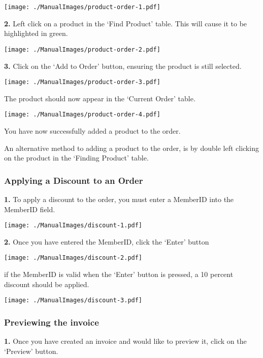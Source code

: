 \texttt{[image: ./ManualImages/product-order-1.pdf]}

\textbf{2.} Left click on a product in the `Find Product' table. This will cause it to be highlighted in green.

\texttt{[image: ./ManualImages/product-order-2.pdf]}

\textbf{3.} Click on the `Add to Order' button, ensuring the product is still selected.

\texttt{[image: ./ManualImages/product-order-3.pdf]}

The product should now appear in the `Current Order' table.

\texttt{[image: ./ManualImages/product-order-4.pdf]}

You have now successfully added a product to the order.

An alternative method to adding a product to the order, is by double left clicking on the product in the `Finding Product' table.

\pagebreak
\subsubsection{Applying a Discount to an Order}
\label{fig:Applying a Discount to an Order}

\textbf{1.} To apply a discount to the order, you must enter a MemberID into the MemberID field.

\texttt{[image: ./ManualImages/discount-1.pdf]}

\textbf{2.} Once you have entered the MemberID, click the `Enter' button

\texttt{[image: ./ManualImages/discount-2.pdf]}

\pagebreak

if the MemberID is valid when the `Enter' button is pressed, a 10 percent discount should be applied.

\texttt{[image: ./ManualImages/discount-3.pdf]}

\pagebreak
\subsubsection{Previewing the invoice}
\label{fig:Previewing the invoice}

\textbf{1.} Once you have created an invoice and would like to preview it, click on the `Preview' button.

